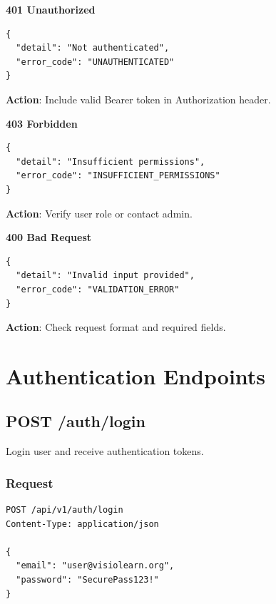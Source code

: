 \documentclass[12pt,a4paper,oneside]{article}
\begin{document}
\begin{tcolorbox}[colback=lightred, colframe=darkblue]
\textbf{401 Unauthorized}
\begin{lstlisting}
{
  "detail": "Not authenticated",
  "error_code": "UNAUTHENTICATED"
}
\end{lstlisting}
\textbf{Action}: Include valid Bearer token in Authorization header.
\end{tcolorbox}

\begin{tcolorbox}[colback=lightred, colframe=darkblue]
\textbf{403 Forbidden}
\begin{lstlisting}
{
  "detail": "Insufficient permissions",
  "error_code": "INSUFFICIENT_PERMISSIONS"
}
\end{lstlisting}
\textbf{Action}: Verify user role or contact admin.
\end{tcolorbox}

\begin{tcolorbox}[colback=lightred, colframe=darkblue]
\textbf{400 Bad Request}
\begin{lstlisting}
{
  "detail": "Invalid input provided",
  "error_code": "VALIDATION_ERROR"
}
\end{lstlisting}
\textbf{Action}: Check request format and required fields.
\end{tcolorbox}

\newpage

\section{Authentication Endpoints}

\subsection{POST /auth/login}

Login user and receive authentication tokens.

\subsubsection{Request}

\begin{lstlisting}
POST /api/v1/auth/login
Content-Type: application/json

{
  "email": "user@visiolearn.org",
  "password": "SecurePass123!"
}
\end{lstlisting}
\end{document}
